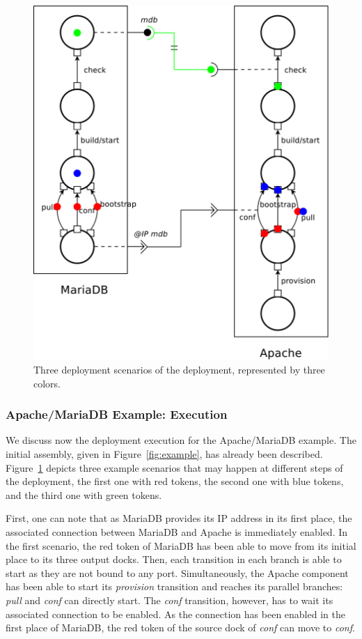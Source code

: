 \begin{figure}[tbp]
  \begin{center}
    \includegraphics[width=0.7\linewidth]{./images/scenari.pdf}
  \end{center}
  \caption{Three deployment scenarios of the deployment, represented by three colors.}
  \label{fig:scenari}
\end{figure}

\subsubsection*{Apache/MariaDB Example: \mad Execution}

We discuss now the deployment execution for the Apache/MariaDB
example.  The initial assembly, given in Figure~\ref{fig:example}, has
already been described. Figure~\ref{fig:scenari} depicts three example
scenarios that may happen at different steps of the deployment, the
first one with red tokens, the second one with blue tokens, and the
third one with green tokens.

First, one can note that as MariaDB provides its IP address in its
first place, the associated connection between MariaDB and Apache is
immediately enabled. In the first scenario, the red token of MariaDB
has been able to move from its initial place to its three output
docks. Then, each transition in each branch is able to start as they
are not bound to any port. Simultaneously, the Apache component has
been able to start its \emph{provision} transition and reaches its
parallel branches: \emph{pull} and \emph{conf} can directly start. The
\emph{conf} transition, however, has to wait its associated connection
to be enabled. As the connection has been enabled in the first place
of MariaDB, the red token of the source dock of \emph{conf} can move
to \emph{conf}.

